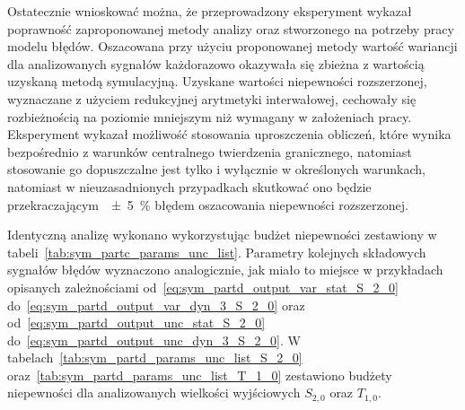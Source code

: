 Ostatecznie wnioskować można, że przeprowadzony eksperyment wykazał poprawność zaproponowanej metody analizy oraz stworzonego na potrzeby pracy modelu błędów. Oszacowana przy użyciu proponowanej metody wartość wariancji dla analizowanych sygnałów każdorazowo okazywała się zbieżna z wartością uzyskaną metodą symulacyjną. Uzyskane wartości niepewności rozszerzonej, wyznaczane z użyciem redukcyjnej arytmetyki interwałowej, cechowały się rozbieżnością na poziomie mniejszym niż wymagany w założeniach pracy. Eksperyment wykazał możliwość stosowania uproszczenia obliczeń, które wynika bezpośrednio z warunków centralnego twierdzenia granicznego, natomiast stosowanie go dopuszczalne jest tylko i wyłącznie w określonych warunkach, natomiast w nieuzasadnionych przypadkach skutkować ono będzie przekraczającym~\qty{\pm 5}{\percent} błędem oszacowania niepewności rozszerzonej.

Identyczną analizę wykonano wykorzystując budżet niepewności zestawiony w tabeli~\ref{tab:sym_partc_params_unc_list}. Parametry kolejnych składowych sygnałów błędów wyznaczono analogicznie, jak miało to miejsce w przykładach opisanych zależnościami od~\eqref{eq:sym_partd_output_var_stat_S_2_0} do~\eqref{eq:sym_partd_output_var_dyn_3_S_2_0} oraz od~\eqref{eq:sym_partd_output_unc_stat_S_2_0} do~\eqref{eq:sym_partd_output_unc_dyn_3_S_2_0}. W tabelach~\ref{tab:sym_partd_params_unc_list_S_2_0} oraz~\ref{tab:sym_partd_params_unc_list_T_1_0} zestawiono budżety niepewności dla analizowanych wielkości wyjściowych $S_{2,0}$ oraz $T_{1,0}$.

